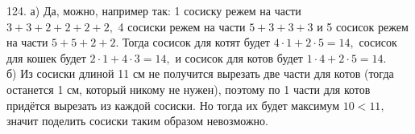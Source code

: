 124. а) Да, можно, например так: 1 сосиску режем на части $3+3+2+2+2+2,$ 4 сосиски режем на части $5+3+3+3$ и 5 сосисок режем на части $5+5+2+2.$ Тогда сосисок для котят будет $4\cdot1+2\cdot5=14,$ сосисок для кошек будет $2\cdot1+4\cdot3=14,$ и сосисок для котов будет $1\cdot4+2\cdot5=14.$\\
б) Из сосиски длиной 11 см не получится вырезать две части для котов (тогда останется 1 см, который никому не нужен), поэтому по 1 части для котов придётся вырезать из каждой сосиски. Но тогда их будет максимум $10<11,$ значит поделить сосиски таким образом невозможно.
\newpage
